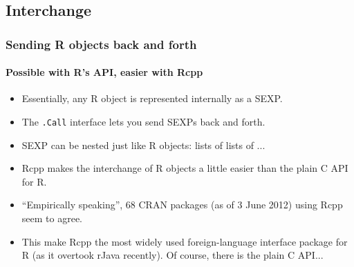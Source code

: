 \documentclass[handout,compress,dvipsnames,pdflatex,beamer]{beamer}
\begin{document}
\subsection{Interchange}
\begin{frame}
  \frametitle{Sending R objects back and forth}
  \framesubtitle{Possible with R's API, easier with Rcpp}
  \begin{itemize}
  \item Essentially, any R object is represented internally as a SEXP.
  \item The \texttt{.Call} interface lets you send SEXPs back and forth.
  \item SEXP can be nested just like R objects: lists of lists of ...
  \item Rcpp makes the interchange of R objects a little easier than the
    plain C API for R. 
  \item ``Empirically speaking'', 68 CRAN packages (as
    of 3 June 2012) using Rcpp seem to agree.
  \item This make Rcpp the most widely used foreign-language interface
    package for R (as it overtook rJava recently). Of course, there is the
    plain C API...
  \end{itemize}
\end{frame}
\end{document}
